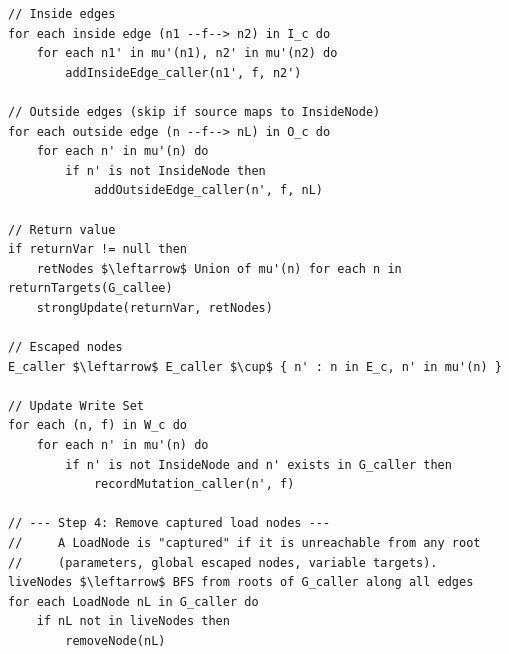 \begin{lstlisting}
// Inside edges
for each inside edge (n1 --f--> n2) in I_c do
    for each n1' in mu'(n1), n2' in mu'(n2) do
        addInsideEdge_caller(n1', f, n2')

// Outside edges (skip if source maps to InsideNode)
for each outside edge (n --f--> nL) in O_c do
    for each n' in mu'(n) do
        if n' is not InsideNode then
            addOutsideEdge_caller(n', f, nL)

// Return value
if returnVar != null then
    retNodes $\leftarrow$ Union of mu'(n) for each n in returnTargets(G_callee)
    strongUpdate(returnVar, retNodes)

// Escaped nodes
E_caller $\leftarrow$ E_caller $\cup$ { n' : n in E_c, n' in mu'(n) }

// Update Write Set
for each (n, f) in W_c do
    for each n' in mu'(n) do
        if n' is not InsideNode and n' exists in G_caller then
            recordMutation_caller(n', f)

// --- Step 4: Remove captured load nodes ---
//     A LoadNode is "captured" if it is unreachable from any root
//     (parameters, global escaped nodes, variable targets).
liveNodes $\leftarrow$ BFS from roots of G_caller along all edges
for each LoadNode nL in G_caller do
    if nL not in liveNodes then
        removeNode(nL)
\end{lstlisting}